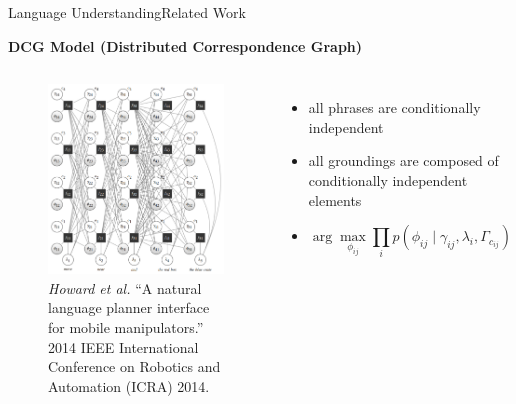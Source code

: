 \begin{frame}{Language Understanding}{Related Work}

{\bf DCG Model (Distributed Correspondence Graph)\footnotemark }

\begin{columns}
\begin{figure}
	\centering
	\includegraphics[width=\textwidth]{figure/DCG}
	\caption{ \tiny{ {\it Howard et al.} ``A natural language planner interface for mobile manipulators.'' 2014 IEEE International Conference on Robotics and Automation (ICRA) 2014. } }
\end{figure}
\begin{itemize}
	\item all phrases are conditionally independent
	\item all groundings are composed of conditionally independent elements
	\item 
	\begin{equation}
	\nonumber
	\arg \max_{ \phi_{ij} } \prod_i p( \phi_{ij} \mid \gamma_{ij} , \lambda_i,  \Gamma_{c_{ij}} )
	\end{equation}
\end{itemize}
\end{columns}


\end{frame}

